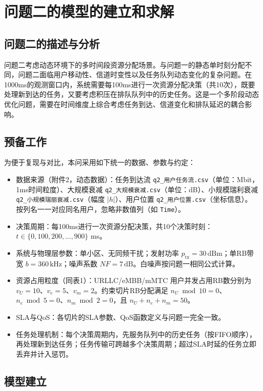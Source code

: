 \section{问题二的模型的建立和求解}
\subsection{问题二的描述与分析}

问题二考虑动态环境下的多时间段资源分配场景。与问题一的静态单时刻分配不同，问题二面临用户移动性、信道时变性以及任务队列动态变化的复杂问题。在1000ms的观测窗口内，系统需要每100ms进行一次资源分配决策（共10次），既要处理新到达的任务，又要考虑积压在排队队列中的历史任务。这是一个多阶段动态优化问题，需要在时间维度上综合考虑任务到达、信道变化和排队延迟的耦合影响。

\subsection{预备工作}
为便于复现与对比，本问采用如下统一的数据、参数与约定：

\begin{itemize}
  \item 数据来源（附件2，动态数据）：任务到达流 \texttt{q2\_用户任务流.csv}（单位：Mbit，1ms时间粒度）、大规模衰减 \texttt{q2\_大规模衰减.csv}（单位：dB）、小规模瑞利衰减 \texttt{q2\_小规模瑞丽衰减.csv}（幅度 $|h|$）、用户位置 \texttt{q2\_用户位置.csv}（坐标信息）。按列名一一对应同名用户，忽略非数值列（如 \texttt{Time}）。
  \item 决策周期：每100ms进行一次资源分配决策，共10个决策时刻：$t \in \{0, 100, 200, \ldots, 900\}$ ms。
  \item 系统与物理层参数：单小区、无同频干扰；发射功率 $p_{\text{tx}}=30\,\text{dBm}$；单RB带宽 $b=360\,\text{kHz}$；噪声系数 $NF=7\,\text{dB}$。白噪声按问题一相同公式计算。
  \item 资源占用粒度（同表1）：URLLC/eMBB/mMTC 用户并发占用RB数分别为 $v_U=10$、$v_e=5$、$v_m=2$。约束切片RB分配满足 $n_U\bmod 10=0$、$n_e\bmod 5=0$、$n_m\bmod 2=0$，且 $n_U+n_e+n_m=50$。
  \item SLA与QoS：各切片的SLA参数、QoS函数定义与问题一完全一致。
  \item 任务处理机制：每个决策周期内，先服务队列中的历史任务（按FIFO顺序），再处理新到达任务；任务传输可跨越多个决策周期；超过SLA时延的任务立即丢弃并计入惩罚。
\end{itemize}

\subsection{模型建立}

